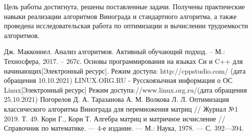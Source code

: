 \documentclass[12pt,a4paper]{report}
\begin{document}
Цель работы достигнута, решены поставленные задачи.
Получены практические навыки реализации алгоритмов Винограда и стандартного алгоритма, а также проведена 
исследовательская работа по оптимизации и вычислении трудоемкости алгоритмов.

\newpage
\renewcommand\bibname{Список литературы}
\makeatletter %
\def\@biblabel#1{#1. }
\makeatother
\begin{thebibliography}{2}
     Дж. Макконнел. Анализ алгоритмов. Активный обучающий подход. -- М.: Техносфера, 2017. -- 267с.
    Основы программирования на языках Си и C++ для начинающих[Электронный ресурс]. Режим доступа: http://cppstudio.com/ (дата обращения 10.10.2021)
    LINUX.ORG.RU - Русскоязычная информация о ОС Linux[Электронный ресурс] Режим доступа://www.linux.org.ru/(дата обращения 25.10.2021)
     Погорелов Д. А. Таразанова А. М. Волкова Л. Л. Оптимизация классического алгоритма Винограда для перемножения матриц // Журнал №1 2019. Т. 49.
    \bibitem{}Корн Г., Корн Т. Алгебра матриц и матричное исчисление // Справочник по математике. — 4-е издание. — М.: Наука, 1978. — С. 392—394.
    
\end{thebibliography}
\end{document}
